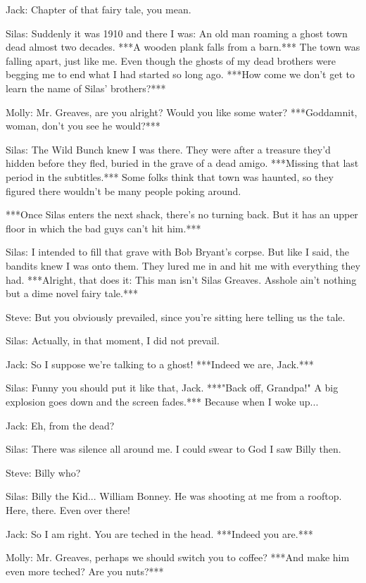 \documentclass{article}
\begin{document}
Jack: Chapter of that fairy tale, you mean.

Silas: Suddenly it was 1910 and there I was: An old man roaming a ghost town dead almost two decades. ***A wooden plank falls from a barn.*** The town was falling apart, just like me. Even though the ghosts of my dead brothers were begging me to end what I had started so long ago. ***How come we don't get to learn the name of Silas' brothers?***

Molly: Mr. Greaves, are you alright? Would you like some water? ***Goddamnit, woman, don't you see he would?***

Silas: The Wild Bunch knew I was there. They were after a treasure they'd hidden before they fled, buried in the grave of a dead amigo. ***Missing that last period in the subtitles.*** Some folks think that town was haunted, so they figured there wouldn't be many people poking around.

***Once Silas enters the next shack, there's no turning back. But it has an upper floor in which the bad guys can't hit him.***

Silas: I intended to fill that grave with Bob Bryant's corpse. But like I said, the bandits knew I was onto them. They lured me in and hit me with everything they had. ***Alright, that does it: This man isn't Silas Greaves. Asshole ain't nothing but a dime novel fairy tale.***

Steve: But you obviously prevailed, since you're sitting here telling us the tale.

Silas: Actually, in that moment, I did not prevail.

Jack: So I suppose we're talking to a ghost! ***Indeed we are, Jack.***

Silas: Funny you should put it like that, Jack. ***"Back off, Grandpa!" A big explosion goes down and the screen fades.*** Because when I woke up...

Jack: Eh, from the dead?

Silas: There was silence all around me. I could swear to God I saw Billy then.

Steve: Billy who?

Silas: Billy the Kid... William Bonney. He was shooting at me from a rooftop. Here, there. Even over there! 

Jack: So I am right. You are teched in the head. ***Indeed you are.***

Molly: Mr. Greaves, perhaps we should switch you to coffee? ***And make him even more teched? Are you nuts?***
\end{document}
